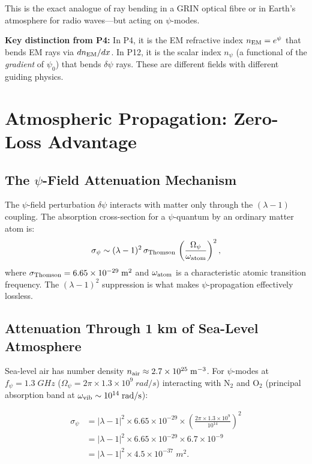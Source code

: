 \documentclass[aps,prd,twocolumn,superscriptaddress]{revtex4-2}
\newcommand{\npsi}{n_\psi}
\begin{document}
This is the exact analogue of ray bending in a GRIN optical fibre or
in Earth's atmosphere for radio waves---but acting on $\psi$-modes.

\textbf{Key distinction from P4:} In P4, it is the EM refractive
index $n_{\rm EM} = e^\psi$ that bends EM rays via $dn_{\rm EM}/dx$.
In P12, it is the scalar index $\npsi$ (a functional of the
\emph{gradient} of $\psi_0$) that bends $\delta\psi$ rays.  These
are different fields with different guiding physics.

\section{Atmospheric Propagation: Zero-Loss Advantage}
\label{sec:atm-prop}

\subsection{The $\psi$-Field Attenuation Mechanism}

The $\psi$-field perturbation $\delta\psi$ interacts with matter only
through the $(\lambda - 1)$ coupling.  The absorption cross-section for
a $\psi$-quantum by an ordinary matter atom is:
\begin{equation}
\sigma_\psi \sim (\lambda - 1)^2\,\sigma_{\rm Thomson}\,
\left(\frac{\Omega_\psi}{\omega_{\rm atom}}\right)^2,
\label{eq:sigma-psi}
\end{equation}
where $\sigma_{\rm Thomson} = 6.65 \times 10^{-29}\;\si{m^2}$ and
$\omega_{\rm atom}$ is a characteristic atomic transition frequency.
The $(\lambda - 1)^2$ suppression is what makes $\psi$-propagation
effectively lossless.

\subsection{Attenuation Through 1 km of Sea-Level Atmosphere}

Sea-level air has number density $n_{\rm air} \approx 2.7 \times
10^{25}\;\si{m^{-3}}$.  For $\psi$-modes at $f_\psi = 1.3\;\si{GHz}$
($\Omega_\psi = 2\pi \times 1.3 \times 10^9\;\si{rad/s}$) interacting
with N$_2$ and O$_2$ (principal absorption band at
$\omega_{\rm vib} \sim 10^{14}\;\si{rad/s}$):

\begin{align}
\sigma_\psi &= |\lambda - 1|^2 \times 6.65\times10^{-29}
\times\left(\frac{2\pi\times1.3\times10^9}{10^{14}}\right)^2 \nonumber\\
&= |\lambda-1|^2 \times 6.65\times10^{-29}
\times 6.7\times10^{-9} \nonumber\\
&= |\lambda-1|^2 \times 4.5\times10^{-37}\;\si{m^2}.
\label{eq:sigma-num}
\end{align}
\end{document}
